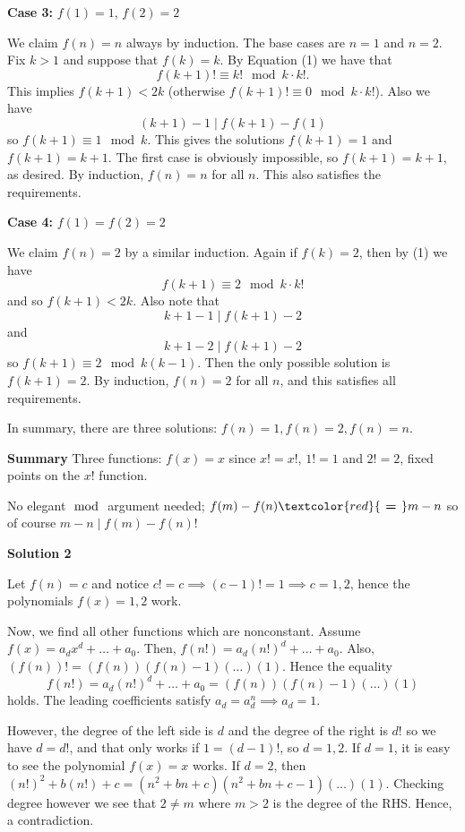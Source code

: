 \begin{enumerate}
 \textbf{Case 3:} $f(1)=1$, $f(2)=2$

 We claim $f(n)=n$ always by induction. The base cases are $n = 1$ and $n = 2$. Fix $k > 1$ and suppose that $f(k)=k$.  By Equation (1) we have that
 \[f(k+1)! \equiv k! \mod k\cdot k! .\]This implies $f(k+1)<2k$ (otherwise $f(k+1)!\equiv 0 \mod k\cdot k!$). Also we have
 \[(k+1)-1  \mid  f(k+1)-f(1)\]so $f(k+1)\equiv 1 \mod k$. This gives the solutions $f(k+1)=1$ and $f(k+1)=k+1$. The first case is obviously impossible, so $f(k + 1) = k + 1$, as desired.  By induction, $f(n) = n$ for all $n$.  This also satisfies the requirements.

 \textbf{Case 4:} $f(1)=f(2)=2$

 We claim $f(n)=2$ by a similar induction. Again if $f(k)=2$, then by (1) we have
 \[f(k+1)\equiv 2 \mod k\cdot k!\]and so $f(k+1)<2k$.  Also note that
 \[k+1-1  \mid  f(k+1)-2\]and
 \[k+1-2  \mid  f(k+1)-2\]so $f(k+1)\equiv 2 \mod k(k-1)$. Then the only possible solution is $f(k+1)=2$. By induction, $f(n) = 2$ for all $n$, and this satisfies all requirements.

 
In summary, there are three solutions: $\boxed{f(n)=1, f(n)=2, f(n)=n}$.

 \textbf{Summary} Three functions: $f(x)=x$ since $x!=x!$, $1!=1$ and $2!=2$, fixed points on the $x!$ function.

 No elegant$\mod$ argument needed; $f(m)-f(n)\textcolor{red}{\textbf{ = }}m-n$ so of course $m-n\mid f(m)-f(n)$!

 



\textbf{Solution 2}

Let $f(n) = c$ and notice $c! = c \implies (c-1)! = 1 \implies c = 1,2$, hence the polynomials $f(x) = 1,2$ work.

 Now, we find all other functions which are nonconstant. Assume $f(x) = a_dx^d + \dots + a_0$. Then, $f(n!) = a_d (n!)^d + \dots + a_0$. Also, $(f(n))! = (f(n))(f(n)-1)(\dots)(1)$. Hence the equality
 \[f(n!) = a_d (n!)^d + \dots + a_0 =  (f(n))(f(n)-1)(\dots)(1)\]holds. The leading coefficients satisfy $a_d = a_d^n \implies a_d = 1$.

 However, the degree of the left side is $d$ and the degree of the right is $d!$ so we have $d = d!$, and that only works if $1 = (d-1)!$, so $d = 1,2$. If $d = 1$, it is easy to see the polynomial $f(x)=x$ works. If $d = 2$, then $(n!)^2 + b(n!)+ c = (n^2+bn+c)(n^2+bn+c-1)(\dots)(1)$. Checking degree however we see that $2 \neq m$ where $m > 2$ is the degree of the RHS. Hence, a contradiction.


\end{enumerate}
